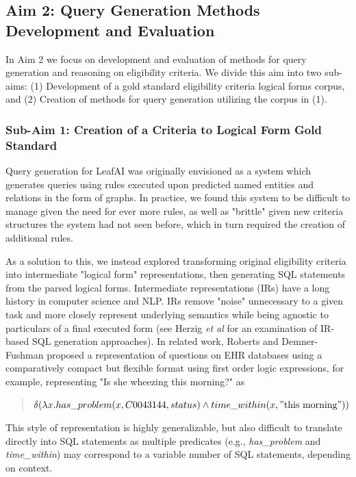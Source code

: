 \documentclass[../main.tex]{subfiles}
\begin{document}
\subsection{Aim 2: Query Generation Methods Development and Evaluation}

In Aim 2 we focus on development and evaluation of methods for query generation and reasoning on eligibility criteria. We divide this aim into two sub-aims: (1) Development of a gold standard eligibility criteria logical forms corpus, and (2) Creation of methods for query generation utilizing the corpus in (1).

\subsubsection{Sub-Aim 1: Creation of a Criteria to Logical Form Gold Standard}

Query generation for LeafAI was originally envisioned as a system which generates queries using rules executed upon predicted named entities and relations in the form of graphs. In practice, we found this system to be difficult to manage given the need for ever more rules, as well as "brittle" given new criteria structures the system had not seen before, which in turn required the creation of additional rules.

As a solution to this, we instead explored transforming original eligibility criteria into intermediate "logical form" representations, then generating SQL statements from the parsed logical forms. Intermediate representations (IRs) have a long history in computer science and NLP. IRs remove "noise" unnecessary to a given task and more closely represent underlying semantics while being agnostic to particulars of a final executed form (see Herzig \textit{et al} \cite{herzig2021unlocking} for an examination of IR-based SQL generation approaches). In related work, Roberts and Demner-Fushman \cite{roberts2016annotating} proposed a representation of questions on EHR databases using a comparatively compact but flexible format using first order logic expressions, for example, representing "Is she wheezing this morning?" as

\begin{quote}
    \centering
    $\delta( \lambda x.has\_problem(x, C0043144, status) \wedge time\_within(x, \mathrm{"this\ morning"}))$
\end{quote}

\noindent This style of representation is highly generalizable, but also difficult to translate directly into SQL statements as multiple predicates (e.g., \textit{has\_problem} and \textit{time\_within}) may correspond to a variable number of SQL statements, depending on context.
\end{document}
